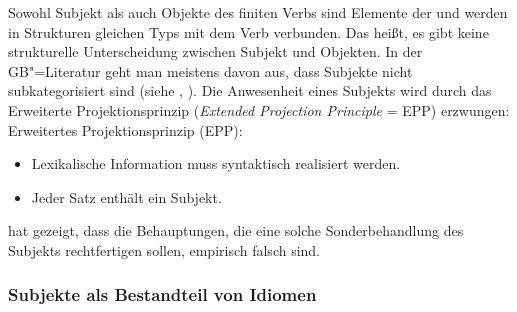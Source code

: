 % 
Sowohl Subjekt als auch Objekte des finiten Verbs sind Elemente der \compsl und werden in Strukturen
gleichen Typs mit dem Verb verbunden.
Das heißt, es gibt keine strukturelle Unterscheidung zwischen Subjekt und 
Objekten. In der GB"=Literatur geht man meistens
davon aus, dass Subjekte nicht subkategorisiert sind (siehe \zb {}, ).
Die Anwesenheit eines Subjekts wird durch das Erweiterte Projektionsprinzip (\emph{Extended Projection
Principle} = EPP) erzwungen:
\ea
Erweitertes Projektionsprinzip (EPP):
\begin{itemize}
\item Lexikalische Information muss syntaktisch realisiert werden.
\item Jeder Satz enthält ein Subjekt. 
\end{itemize}
\z

\noindent
\citet[Abschnitt~2]{Bresnan82c} hat gezeigt, dass die Behauptungen,
die eine solche Sonderbehandlung des Subjekts rechtfertigen sollen, empirisch falsch sind.


\subsubsection{Subjekte als Bestandteil von Idiomen}


